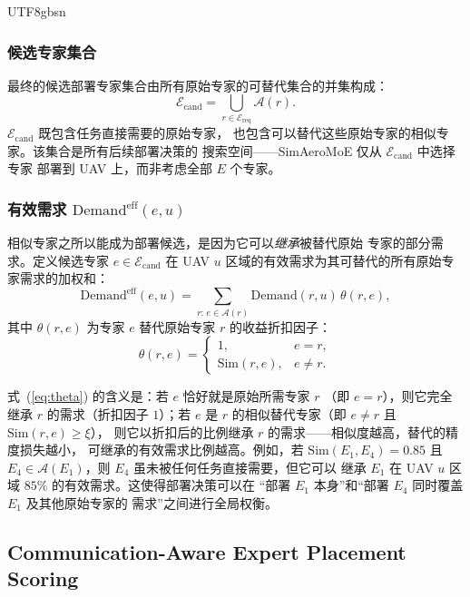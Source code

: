 \documentclass[conference]{IEEEtran}
\begin{document}
\begin{CJK*}{UTF8}{gbsn}
\subsubsection{候选专家集合}

最终的候选部署专家集合由所有原始专家的可替代集合的并集构成：
\begin{equation}
\mathcal{E}_{\mathrm{cand}} = \bigcup_{r\in\mathcal{E}_{\mathrm{req}}}
\mathcal{A}(r).
\label{eq:ecand}
\end{equation}
$\mathcal{E}_{\mathrm{cand}}$ 既包含任务直接需要的原始专家，
也包含可以替代这些原始专家的相似专家。该集合是所有后续部署决策的
搜索空间——SimAeroMoE 仅从 $\mathcal{E}_{\mathrm{cand}}$ 中选择专家
部署到 UAV 上，而非考虑全部 $E$ 个专家。

\subsubsection{有效需求 \texorpdfstring{$\mathrm{Demand}^{\mathrm{eff}}(e,u)$}{Demand\_eff(e,u)}}

相似专家之所以能成为部署候选，是因为它可以\emph{继承}被替代原始
专家的部分需求。定义候选专家 $e\in\mathcal{E}_{\mathrm{cand}}$ 在
UAV $u$ 区域的有效需求为其可替代的所有原始专家需求的加权和：
\begin{equation}
\mathrm{Demand}^{\mathrm{eff}}(e,u) =
\sum_{r:\,e\in\mathcal{A}(r)} \!\! \mathrm{Demand}(r,u) \, \theta(r,e),
\label{eq:demand_eff}
\end{equation}
其中 $\theta(r,e)$ 为专家 $e$ 替代原始专家 $r$ 的收益折扣因子：
\begin{equation}
\theta(r,e) =
\begin{cases}
1,                     & e = r,\\[4pt]
\mathrm{Sim}(r,e),     & e \neq r.
\end{cases}
\label{eq:theta}
\end{equation}

式~(\ref{eq:theta}) 的含义是：若 $e$ 恰好就是原始所需专家 $r$
（即 $e=r$），则它完全继承 $r$ 的需求（折扣因子 $1$）；若 $e$ 是
$r$ 的相似替代专家（即 $e\neq r$ 且 $\mathrm{Sim}(r,e)\ge\xi$），
则它以折扣后的比例继承 $r$ 的需求——相似度越高，替代的精度损失越小，
可继承的有效需求比例越高。例如，若 $\mathrm{Sim}(E_1,E_4)=0.85$ 且
$E_4\in\mathcal{A}(E_1)$，则 $E_4$ 虽未被任何任务直接需要，但它可以
继承 $E_1$ 在 UAV $u$ 区域 $85\%$ 的有效需求。这使得部署决策可以在
``部署 $E_1$ 本身''和``部署 $E_4$ 同时覆盖 $E_1$ 及其他原始专家的
需求''之间进行全局权衡。

\subsection{Communication-Aware Expert Placement Scoring}
\label{sec:placement_scoring}


\end{CJK*}
\end{document}
